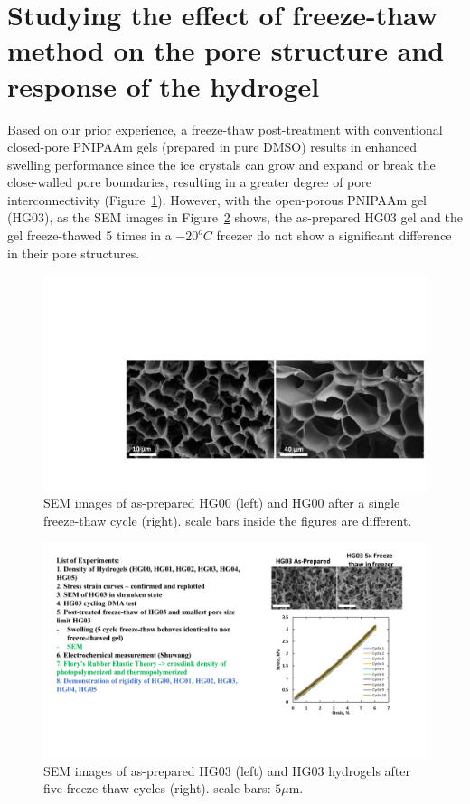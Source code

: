 \section{Studying the effect of freeze-thaw method on the pore structure and response of the hydrogel}
Based on our prior experience, a freeze-thaw post-treatment with conventional closed-pore PNIPAAm gels (prepared in pure DMSO) results in enhanced swelling performance since the ice crystals can grow and expand or break the close-walled pore boundaries, resulting in a greater degree of pore interconnectivity (Figure~\ref{fig:freeze}). However, with the open-porous PNIPAAm gel (HG03), as the SEM images in Figure~\ref{fig:freeze1} shows, the as-prepared HG03 gel and the gel freeze-thawed 5 times in a $-20^{o}C$ freezer do not show a significant difference in their pore structures.

\begin{figure}[!th]
      \centering
      \includegraphics[width=\textwidth]{freeze.pdf}
      \caption[SEM images of as-prepared HG00]{SEM images of as-prepared HG00 (left) and HG00 after a single freeze-thaw cycle (right). scale bars inside the figures are different.}
      \label{fig:freeze}
\end{figure}

\begin{figure}[!th]
      \centering
      \includegraphics[width=\textwidth]{freeze1.pdf}
      \caption[SEM images of as-prepared HG03] {SEM images of as-prepared HG03 (left)  and HG03 hydrogels after five freeze-thaw cycles (right). scale bars: $5\mu$m.}
      \label{fig:freeze1}
\end{figure}

